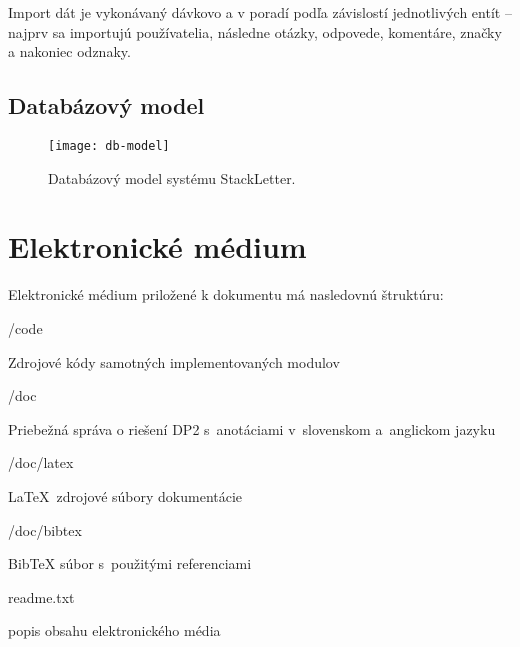 Import dát je vykonávaný dávkovo a v poradí podľa závislostí jednotlivých entít -- najprv sa importujú používatelia,
následne otázky, odpovede, komentáre, značky a nakoniec odznaky.


\section{Databázový model}\label{apx:dbmodel}
\begin{figure}[H]\begin{center}
\texttt{[image: db-model]}
\caption{Databázový model systému StackLetter.\label{fig:db-model}}\end{center}
\end{figure}



\chapter{Elektronické médium}

Elektronické médium priložené k dokumentu má nasledovnú štruktúru:
\begin{my_itemize}
\emptyitem /code
	\begin{my_itemize}
	\myitem Zdrojové kódy samotných implementovaných modulov
	\end{my_itemize}
\emptyitem /doc
	\begin{my_itemize}
	\myitem Priebežná správa o riešení DP2 s~anotáciami v~slovenskom a~anglickom jazyku
	\end{my_itemize}
\emptyitem /doc/latex
	\begin{my_itemize}
	\myitem \LaTeX~zdrojové súbory dokumentácie
	\end{my_itemize}
\emptyitem /doc/bibtex
	\begin{my_itemize}
	\myitem BibTeX súbor s~použitými referenciami
	\end{my_itemize}
\emptyitem readme.txt
  \begin{my_itemize}
  \myitem popis obsahu elektronického média
  \end{my_itemize}
\end{my_itemize}

